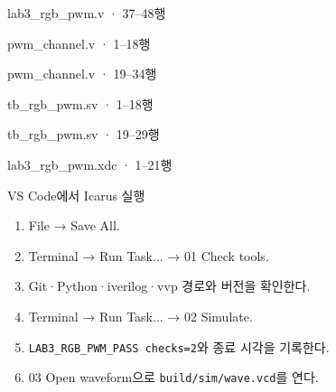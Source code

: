 \begin{frame}[fragile]{lab3\_rgb\_pwm.v · 37–48행}

\end{frame}

\begin{frame}[fragile]{pwm\_channel.v · 1–18행}

\end{frame}

\begin{frame}[fragile]{pwm\_channel.v · 19–34행}

\end{frame}

\begin{frame}[fragile]{tb\_rgb\_pwm.sv · 1–18행}

\end{frame}

\begin{frame}[fragile]{tb\_rgb\_pwm.sv · 19–29행}

\end{frame}

\begin{frame}[fragile]{lab3\_rgb\_pwm.xdc · 1–21행}

\end{frame}


\begin{frame}[label=simulate]{VS Code에서 Icarus 실행}
\small
\begin{enumerate}
\item File → Save All.
\item Terminal → Run Task... → 01 Check tools.
\item Git·Python·iverilog·vvp 경로와 버전을 확인한다.
\item Terminal → Run Task... → 02 Simulate.
\item \texttt{LAB3\_RGB\_PWM\_PASS checks=2}와 종료 시각을 기록한다.
\item 03 Open waveform으로 \texttt{build/sim/wave.vcd}를 연다.
\end{enumerate}
\end{frame}

